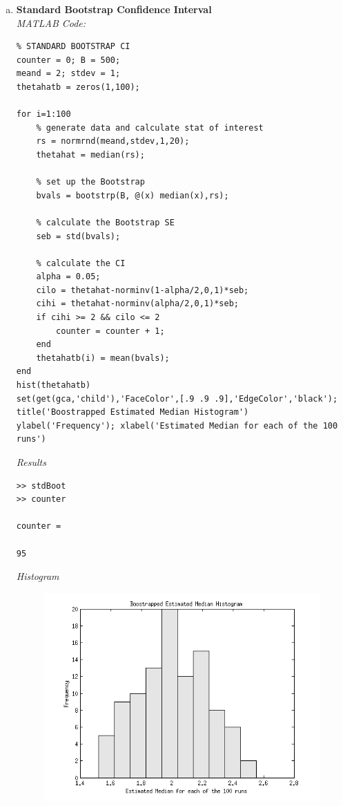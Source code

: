 \documentclass[12pt,a4paper]{article}
\begin{document}
\begin{enumerate}[a)]

\item{\textbf{Standard Bootstrap Confidence Interval}\\
\textit{MATLAB Code:}
\begin{verbatim}
% STANDARD BOOTSTRAP CI
counter = 0; B = 500;
meand = 2; stdev = 1;
thetahatb = zeros(1,100);

for i=1:100
    % generate data and calculate stat of interest
    rs = normrnd(meand,stdev,1,20);
    thetahat = median(rs);
    
    % set up the Bootstrap
    bvals = bootstrp(B, @(x) median(x),rs);
    
    % calculate the Bootstrap SE
    seb = std(bvals);
    
    % calculate the CI
    alpha = 0.05;
    cilo = thetahat-norminv(1-alpha/2,0,1)*seb;
    cihi = thetahat-norminv(alpha/2,0,1)*seb;
    if cihi >= 2 && cilo <= 2
        counter = counter + 1;
    end
    thetahatb(i) = mean(bvals);
end
hist(thetahatb)
set(get(gca,'child'),'FaceColor',[.9 .9 .9],'EdgeColor','black');
title('Boostrapped Estimated Median Histogram')
ylabel('Frequency'); xlabel('Estimated Median for each of the 100 runs')
\end{verbatim}

\textit{Results}\\
\begin{verbatim}
>> stdBoot
>> counter

counter =

95
\end{verbatim}

\textit{Histogram}

\begin{figure}[ht!] 
\begin{center}
\includegraphics[scale=.7]{inClass_std_hist.png}
\caption{}
\label{inclass6 fig1}
\end{center}
\end{figure}
\FloatBarrier
}


\end{enumerate}
\end{document}
